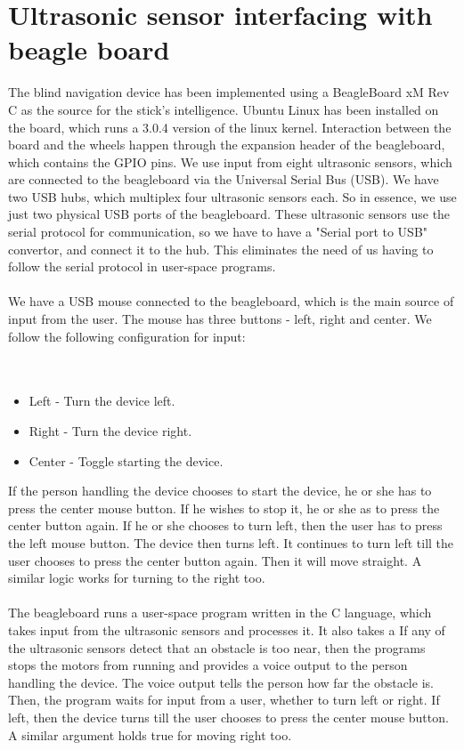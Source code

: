 \documentclass[12pt]{article}
\begin{document}
\section{Ultrasonic sensor interfacing with beagle board}
The blind navigation device has been implemented using a BeagleBoard xM Rev C as the source for the stick's intelligence. Ubuntu Linux has been installed on the board, which runs a 3.0.4 version of the linux kernel. Interaction between the board and the wheels happen through the expansion header of the beagleboard, which contains the GPIO pins. We use input from eight ultrasonic sensors, which are connected to the beagleboard via the Universal Serial Bus (USB). We have two USB hubs, which multiplex four ultrasonic sensors each. So in essence, we use just two physical USB ports of the beagleboard. These ultrasonic sensors use the serial protocol for communication, so we have to have a "Serial port to USB" convertor, and connect it to the hub. This eliminates the need of us having to follow the serial protocol in user-space programs.
\\
\\
We have a USB mouse connected to the beagleboard, which is the main source of input from the user. The mouse has three buttons - left, right and center. We follow the following configuration for input:
\\
\\
\\
\begin{itemize}
\item Left - Turn the device left.
\item Right - Turn the device right.
\item Center - Toggle starting the device.
\end{itemize}
If the person handling the device chooses to start the device, he or she has to press the center mouse button. If he wishes to stop it, he or she as to press the center button again. If he or she chooses to turn left, then the user has to press the left mouse button. The
device then turns left. It continues to turn left till the user chooses to press the center button again. Then it will move straight. A similar logic works for turning to the right too.
\\
\\
The beagleboard runs a user-space program written in the C language, which takes input from the ultrasonic sensors and processes it. It also takes a If any of the ultrasonic sensors detect that an obstacle is too near, then the programs stops the motors from running and provides a voice output to the person handling the device. The voice output tells the person how far the obstacle is. Then, the program waits for input from a user, whether to turn left or right. If left, then the device turns till the user chooses to press the center mouse button. A similar argument holds true for moving right too.
\end{document}

